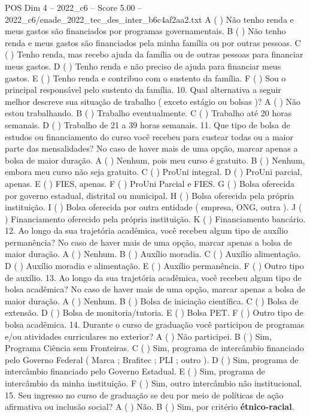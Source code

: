 \begin{textsample}{POS Dim 4 – 2022\_c6 – Score 5.00 – 2022\_c6/enade\_2022\_tec\_des\_inter\_b6c4af2aa2.txt}
A ( ) Não tenho renda e meus gastos são financiados por programas governamentais.
B ( ) Não tenho renda e meus gastos são financiados pela minha família ou por outras pessoas.
C ( ) Tenho renda, mas recebo ajuda da família ou de outras pessoas para financiar meus gastos.
D ( ) Tenho renda e não preciso de ajuda para financiar meus gastos.
E ( ) Tenho renda e contribuo com o sustento da família.
F ( ) Sou o principal responsável pelo sustento da família. 10.
Qual alternativa a seguir melhor descreve sua situação de trabalho ( exceto estágio ou bolsas )?
A ( ) Não estou trabalhando.
B ( ) Trabalho eventualmente.
C ( ) Trabalho até 20 horas semanais.
D ( ) Trabalho de 21 a 39 horas semanais. 11.
Que tipo de bolsa de estudos ou financiamento do curso você recebeu para custear todas ou a maior parte das mensalidades?
No caso de haver mais de uma opção, marcar apenas a bolsa de maior duração.
A ( ) Nenhum, pois meu curso é gratuito.
B ( ) Nenhum, embora meu curso não seja gratuito.
C ( ) ProUni integral.
D ( ) ProUni parcial, apenas.
E ( ) FIES, apenas.
F ( ) ProUni Parcial e FIES.
G ( ) Bolsa oferecida por governo estadual, distrital ou municipal.
H ( ) Bolsa oferecida pela própria instituição.
I ( ) Bolsa oferecida por outra entidade ( empresa, ONG, outra ).
J ( ) Financiamento oferecido pela própria instituição.
K ( ) Financiamento bancário. 12.
Ao longo da sua trajetória acadêmica, você recebeu algum tipo de auxílio permanência?
No caso de haver mais de uma opção, marcar apenas a bolsa de maior duração.
A ( ) Nenhum.
B ( ) Auxílio moradia.
C ( ) Auxílio alimentação.
D ( ) Auxílio moradia e alimentação.
E ( ) Auxílio permanência.
F ( ) Outro tipo de auxílio. 13.
Ao longo da sua trajetória acadêmica, você recebeu algum tipo de bolsa acadêmica?
No caso de haver mais de uma opção, marcar apenas a bolsa de maior duração.
A ( ) Nenhum.
B ( ) Bolsa de iniciação científica.
C ( ) Bolsa de extensão.
D ( ) Bolsa de monitoria/tutoria.
E ( ) Bolsa PET.
F ( ) Outro tipo de bolsa acadêmica. 14.
Durante o curso de graduação você participou de programas e/ou atividades curriculares no exterior?
A ( ) Não participei.
B ( ) Sim, Programa Ciência sem Fronteiras.
C ( ) Sim, programa de intercâmbio financiado pelo Governo Federal ( Marca ; Brafitec ; PLI ; outro ).
D ( ) Sim, programa de intercâmbio financiado pelo Governo Estadual.
E ( ) Sim, programa de intercâmbio da minha instituição.
F ( ) Sim, outro intercâmbio não institucional. 15.
Seu ingresso no curso de graduação se deu por meio de políticas de ação afirmativa ou inclusão social?
A ( ) Não.
B ( ) Sim, por critério \textbf{étnico-racial}.

\end{textsample}
